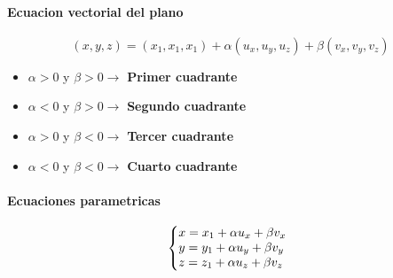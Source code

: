 \documentclass[11pt]{article}
\begin{document}
\paragraph{Ecuacion vectorial del plano}
\begin{equation*}
	(x, y, z) = (x_1, x_1, x_1) + \alpha(u_x, u_y, u_z) + \beta(v_x, v_y, v_z)
\end{equation*}
\begin{itemize}
	\item $\alpha > 0$ y $\beta > 0 \rightarrow$ \textbf{Primer cuadrante}
	\item $\alpha < 0$ y $\beta > 0 \rightarrow$ \textbf{Segundo cuadrante}
	\item $\alpha > 0$ y $\beta < 0 \rightarrow$ \textbf{Tercer cuadrante}
	\item $\alpha < 0$ y $\beta < 0 \rightarrow$ \textbf{Cuarto cuadrante}
\end{itemize}
\paragraph{Ecuaciones parametricas}
\begin{equation*}
  \left\{
    \begin{array}{@{} l c @{}}
    x = x_1 + \alpha u_x + \beta v_x \\
    y = y_1 + \alpha u_y + \beta v_y\\
    z = z_1 + \alpha u_z + \beta v_z
    \end{array}\right.
\end{equation*}
\end{document}
